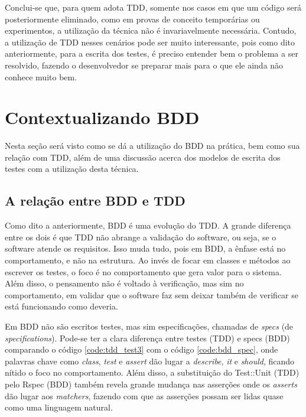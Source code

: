 Conclui-se que, para quem adota TDD, somente nos casos em que um código será posteriormente eliminado, como em provas de conceito temporárias ou experimentos, a utilização da técnica não é invariavelmente necessária. Contudo, a utilização de TDD nesses cenários pode ser muito interessante, pois como dito anteriormente, para a escrita dos testes, é preciso entender bem o problema a ser resolvido, fazendo o desenvolvedor se preparar mais para o que ele ainda não conhece muito bem.


\section{Contextualizando BDD}

Nesta seção será visto como se dá a utilização do BDD na prática, bem como sua relação com TDD, além de uma discussão acerca dos modelos de escrita dos testes com a utilização desta técnica.

\subsection{A relação entre BDD e TDD}
\label{sub:a_relacao_entre_bdd_e_tdd}

Como dito a anteriormente, BDD é uma evolução do TDD. A grande diferença entre os dois é que TDD não abrange a validação do software, ou seja, se o software atende os requisitos. Isso muda tudo, pois em BDD, a ênfase está no comportamento, e não na estrutura. Ao invés de focar em classes e métodos ao escrever os testes, o foco é no comportamento que gera valor para o sistema. Além disso, o pensamento não é voltado à verificação, mas sim no comportamento, em validar que o software faz sem deixar também de verificar se está funcionando como deveria.

Em BDD não são escritos testes, mas sim especificações, chamadas de \textit{specs} (de \textit{specifications}). Pode-se ter a clara diferença entre testes (TDD) e specs (BDD) comparando o código \ref{code:tdd_test3} com o código \ref{code:bdd_spec}, onde palavras chave como \textit{class}, \textit{test} e \textit{assert} dão lugar a \textit{describe}, \textit{it} e \textit{should}, ficando nítido o foco no comportamento. Além disso, a substituição do Test::Unit (TDD) pelo Rspec (BDD) também revela grande mudança nas asserções onde os \textit{asserts} dão lugar aos \textit{matchers}, fazendo com que as asserções possam ser lidas quase como uma linguagem natural.

